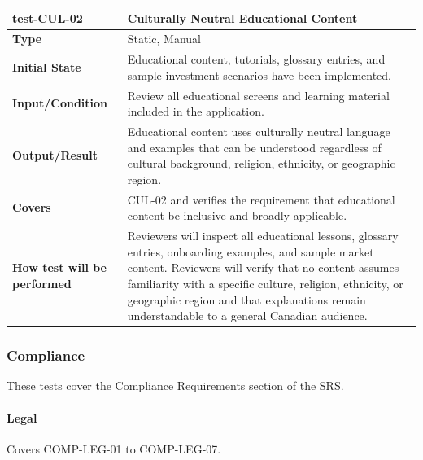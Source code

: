 \documentclass[12pt, titlepage]{article}
\begin{document}
\noindent\begin{tabularx}{\textwidth}{>{\raggedright\arraybackslash}p{3.5cm}X}
  \toprule
  \textbf{test-CUL-02} & \textbf{Culturally Neutral Educational Content}\\
  \midrule
  \textbf{Type} & Static, Manual\\
  \textbf{Initial State} & Educational content, tutorials, glossary entries, and sample investment scenarios have been implemented.\\
  \textbf{Input/Condition} & Review all educational screens and learning material included in the application.\\
  \textbf{Output/Result} & Educational content uses culturally neutral language and examples that can be understood regardless of cultural background, religion, ethnicity, or geographic region.\\
  \textbf{Covers} & CUL-02 and verifies the requirement that educational content be inclusive and broadly applicable.\\
  \textbf{How test will be performed} & Reviewers will inspect all educational lessons, glossary entries, onboarding examples, and sample market content. Reviewers will verify that no content assumes familiarity with a specific culture, religion, ethnicity, or geographic region and that explanations remain understandable to a general Canadian audience.\\
  \bottomrule
\end{tabularx}

\subsubsection{Compliance}

These tests cover the Compliance Requirements section of the SRS.

\paragraph{Legal}

Covers COMP-LEG-01 to COMP-LEG-07.
\end{document}
